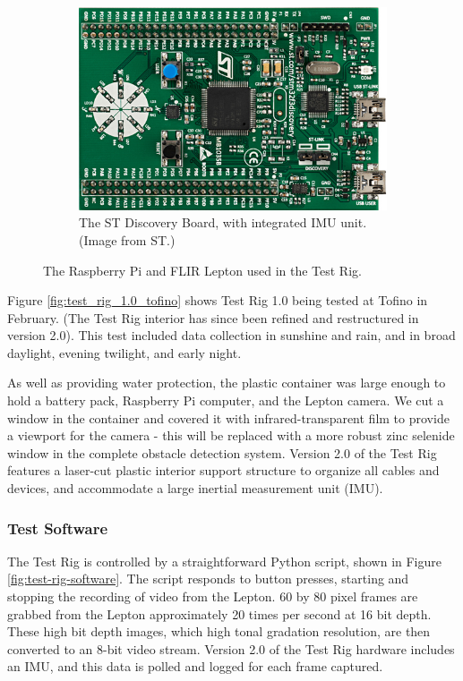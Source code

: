 \begin{figure}[h]
\begin{subfigure}{.45\textwidth}
\centering
\includegraphics[width=.90\linewidth]{"./image/discovery-board"}
\caption[Discovery Board]{\label{fig:discovery-board}The ST Discovery Board, with integrated IMU unit. (Image from ST.)}
\end{subfigure}
\caption[Equipment used in the Test Rig.]{\label{fig:rpi-lepton}The Raspberry Pi and FLIR Lepton used in the Test Rig.}
\end{figure}

Figure \ref{fig:test_rig_1.0_tofino} shows Test Rig 1.0 being tested at Tofino in February. (The Test Rig interior has since been refined and restructured in version 2.0). This test included data collection in sunshine and rain, and in broad daylight, evening twilight, and early night.

As well as providing water protection, the plastic container was large enough to hold a battery pack, Raspberry Pi computer, and  the Lepton camera. We cut a window in the container and covered it with infrared-transparent film to provide a viewport for the camera - this will be replaced with a more robust zinc selenide window in the complete obstacle detection system.  Version 2.0 of the Test Rig features a laser-cut plastic interior support structure to organize all cables and devices, and accommodate a large inertial measurement unit (IMU).  

\subsubsection{\label{sec:discussion:equipment:software}Test Software}
The Test Rig is controlled by a straightforward Python script, shown in Figure \ref{fig:test-rig-software}. The script responds to button presses, starting and stopping the recording of video from the Lepton. 60 by 80 pixel frames are grabbed from the Lepton approximately 20 times per second at 16 bit depth. These high bit depth images, which high tonal gradation resolution, are then converted to an 8-bit video stream. Version 2.0 of the Test Rig hardware includes an IMU, and this data is polled and logged for each frame captured.


